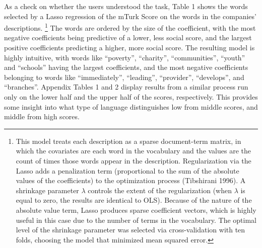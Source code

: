 \documentclass[12pt]{article}
\begin{document}
As a check on whether the users understood the task, Table 1 shows the words selected by a Lasso regression of the mTurk Score on the words in the companies’ descriptions. \footnote{This model treats each description as a sparse document-term matrix, in which the covariates are each word in the vocabulary and the values are the count of times those words appear in the description. Regularization via the Lasso adds a penalization term (proportional to the sum of the absolute values of the coefficients) to the optimization process (Tibshirani 1996). A shrinkage parameter $\lambda$ controls the extent of the regularization (when $\lambda$ is equal to zero, the results are identical to OLS). Because of the nature of the absolute value term, Lasso produces sparse coefficient vectors, which is highly useful in this case due to the number of terms in the vocabulary.  The optimal level of the shrinkage parameter was selected via cross-validation with ten folds, choosing the model that minimized mean squared error.} The words are ordered by the size of the coefficient, with the most negative coefficients being predictive of a lower, less social score, and the largest positive coefficients predicting a higher, more social score. The resulting model is highly intuitive, with words like ``poverty'', ``charity'', ``communities'', ``youth'' and ``schools'' having the largest coefficients, and the most negative coefficients belonging to words like ``immediately'', ``leading'', ``provider'', ``develops'', and ``branches''. Appendix Tables 1 and 2 display results from a similar process run only on the lower half and the upper half of the scores, respectively. This provides some insight into what type of language distinguishes low from middle scores, and middle from high scores.
\end{document}

